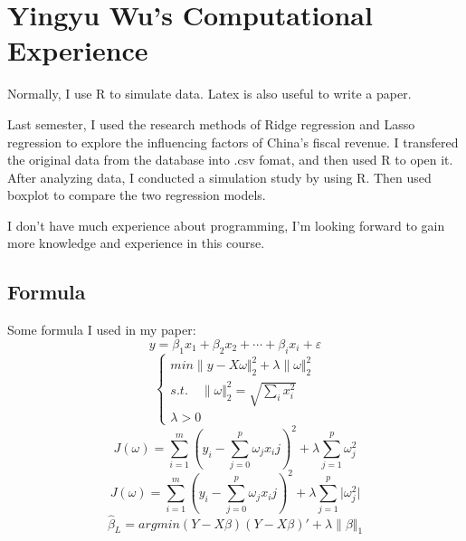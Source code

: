 
\section{ Yingyu Wu's Computational Experience}
Normally, I use R to simulate data. Latex is also useful to write a paper.\par
Last semester, I used the research methods of Ridge regression and Lasso regression to explore the influencing factors of China’s fiscal revenue. I transfered the original data from the database into .csv fomat, and then used R to open it. After analyzing data, I conducted a simulation study by using R. Then used boxplot to compare the two regression models.\par

I don't have much experience about programming, I'm looking forward to gain more knowledge and experience in this course.\par

\subsection{Formula}
Some formula I used in my paper:
\begin{equation}
y=\beta_1x_1+\beta_2x_2+\cdots+\beta_ix_i+\varepsilon
\end{equation}
\begin{equation}
\begin{cases}
min\|y-X\omega\Vert_2^2+\lambda\|\omega\Vert_2^2 \\
s.t.\quad\|\omega\Vert_2^2=\sqrt {\sum_i x_i^2}\\
\lambda>0
\end{cases}
\end{equation}
\begin{equation}
J(\omega)=\sum\limits_{i=1}^m (y_i-\sum\limits_{j=0}^p \omega_jx_ij)^2 + \lambda \sum\limits_{j=1}^p \omega_j^2
\end{equation}
\begin{equation}
J(\omega)=\sum\limits_{i=1}^m (y_i-\sum\limits_{j=0}^p \omega_jx_ij)^2 + \lambda \sum\limits_{j=1}^p |\omega_j^2\vert
\end{equation}
\begin{equation}
\hat{\beta}_L=arg min(Y-X\beta)(Y-X\beta)'+\lambda\|\beta\Vert_1
\end{equation}

